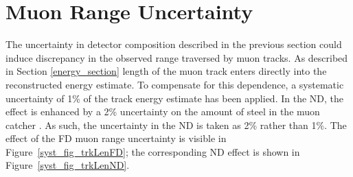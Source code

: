 {\begin{figure}
\end{figure}

\clearpage


\section{Muon Range Uncertainty}

The uncertainty in detector composition described in the previous section
could induce discrepancy in the observed range traversed by muon tracks.
As described in Section \ref{energy_section} length of the muon track enters
directly into the reconstructed energy estimate.
To compensate for this dependence, a systematic uncertainty
of 1\% of the track energy estimate has been applied.
In the ND, the effect is enhanced by a 2\% uncertainty on the
amount of steel in the muon catcher \cite{raddatz2016thesis}.
As such, the uncertainty in the ND is taken as 2\% rather than 1\%.
The effect of the FD muon range uncertainty is visible in
Figure~\ref{syst_fig_trkLenFD};
the corresponding ND effect is shown in Figure~\ref{syst_fig_trkLenND}.

}
